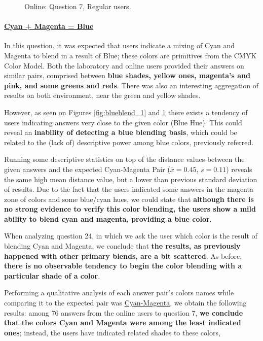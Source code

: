\begin{figure}[!htbp]
\begin{minipage}{0.4\textwidth}
    \caption[Online: Answers for Question 7, from regular users.]{Online: Question 7, Regular users.}
    \label{fig:blueblend_2}
  \end{minipage}
  \vspace{-5pt}
\end{figure}
%
\paragraph{\ul{Cyan + Magenta = Blue}}
%
In this question, it was expected that users indicate a mixing of Cyan and Magenta to blend in a result of Blue; these colors are primitives from the CMYK Color Model. Both the laboratory and online users provided their answers
on similar pairs, comprised between \textbf{blue shades, yellow ones, magenta's and pink, and some greens and reds}. There was also an interesting aggregation of results on both environment, near the green and yellow shades.  \par
%
However, as seen on Figures \ref{fig:blueblend_1} and \ref{fig:blueblend_2} there exists a tendency of users indicating answers very close to the given color (Blue Hue). This could reveal an \textbf{inability of detecting a blue blending
basis}, which could be related to the (lack of) descriptive power among blue colors, previously referred. \par
%
Running some descriptive statistics on top of the distance values between the given answers and the expected Cyan-Magenta Pair ($\overline{x} = 0.45$, $s = 0.11$) reveals the same high mean distance value, but a lower than previous
standard deviation of results. Due to the fact that the users indicated some answers in the magenta zone of colors and some blue/cyan hues, we could state that \textbf{although there is no strong evidence to verify this color blending, the
users show a mild ability to blend cyan and magenta, providing a blue color}. \par
%
When analyzing question 24, in which we ask the user which color is the result of blending Cyan and Magenta, we conclude that \textbf{the results, as previously happened with other primary blends, are a bit scattered}.
As before, \textbf{there is no observable tendency to begin the color blending with a particular shade of a color}. \par
%
Performing a qualitative analysis of each answer pair's colors names while comparing it to the expected pair was
\ul{Cyan-Magenta}, we obtain the following results: among 76 answers from the online users to question 7, \textbf{we conclude
that the colors Cyan and Magenta were among the least indicated ones}; instead, the users have indicated related shades to these colors,

